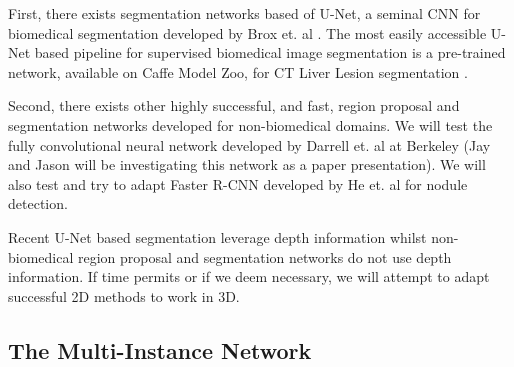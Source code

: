 \documentclass[twocolumn,10pt]{article}
\begin{document}
First, there exists segmentation networks based of U-Net, a seminal CNN for biomedical
segmentation developed by Brox et. al \cite{U-net_2015}. The most easily accessible
U-Net based pipeline for supervised biomedical image segmentation is 
a pre-trained network, available on Caffe Model Zoo, for CT Liver Lesion 
segmentation \cite{DBLP:journals/corr/ChristEETBBRAHD16}.

Second, there exists other highly successful, and fast, region proposal and 
segmentation networks developed for non-biomedical domains. We
will test the fully convolutional neural network developed by Darrell et. al at
Berkeley \cite{long_shelhamer_fcn} (Jay and Jason will be investigating this network as a paper 
presentation). We will also test and try to adapt Faster R-CNN developed by He 
et. al \cite{fast_rcnn_2015, faster_rcnn_2015} for nodule detection.

Recent U-Net based segmentation leverage depth information whilst non-biomedical
region proposal and segmentation networks do not use depth information. If time permits or
if we deem necessary, we will attempt to adapt successful 2D methods to work in 3D. 




\subsection{The Multi-Instance Network}
\end{document}
